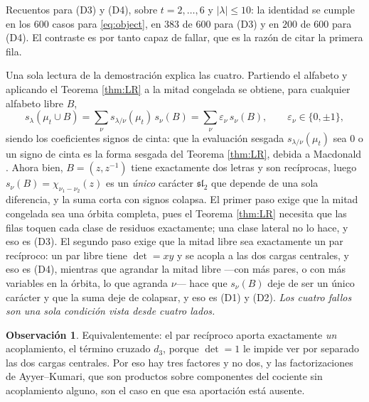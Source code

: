 \documentclass[11pt,reqno]{amsart}
\theoremstyle{plain}
\theoremstyle{definition}
\newtheorem{remark}[theorem]{Observación}
\newcommand{\zt}{\mu_t}
\begin{document}
Recuentos para (D3) y (D4), sobre $t=2,\dots,6$ y $|\lambda|\le10$: la identidad se cumple en los
$600$ casos para \eqref{eq:object}, en $383$ de $600$ para (D3) y en $200$ de $600$ para (D4). El
contraste es por tanto capaz de fallar, que es la razón de citar la primera fila.

Una sola lectura de la demostración explica las cuatro. Partiendo el alfabeto y aplicando el Teorema
\ref{thm:LR} a la mitad congelada se obtiene, para cualquier alfabeto libre $B$,
\begin{equation}\label{eq:threestep}
s_\lambda(\zt\cup B)=\sum_{\nu}s_{\lambda/\nu}(\zt)\,s_\nu(B)=\sum_\nu\varepsilon_\nu\,s_\nu(B),
\qquad \varepsilon_\nu\in\{0,\pm1\},
\end{equation}
siendo los coeficientes signos de cinta: que la evaluación sesgada $s_{\lambda/\nu}(\zt)$ sea $0$ o
un signo de cinta es la forma sesgada del Teorema \ref{thm:LR}, debida a Macdonald
\cite[p.~91]{Mac95}. Ahora bien, $B=(z,z^{-1})$ tiene exactamente dos letras y
son recíprocas, luego $s_\nu(B)=\chi_{\nu_1-\nu_2}(z)$ es un \emph{único} carácter
$\mathfrak{sl}_2$ que depende de una sola diferencia, y la suma corta con signos colapsa. El primer
paso exige que la mitad congelada sea una órbita completa, pues el Teorema \ref{thm:LR} necesita que
las filas toquen cada clase de residuos exactamente; una clase lateral no lo hace, y eso es (D3). El
segundo paso exige que la mitad libre sea exactamente un par recíproco: un par libre tiene
$\det=xy$ y se acopla a las dos cargas centrales, y eso es (D4), mientras que agrandar la mitad libre
---con más pares, o con más variables en la órbita, lo que agranda $\nu$--- hace que $s_\nu(B)$ deje
de ser un único carácter y que la suma deje de colapsar, y eso es (D1) y (D2). \emph{Los cuatro
fallos son una sola condición vista desde cuatro lados.}

\begin{remark}
Equivalentemente: el par recíproco aporta exactamente \emph{un} acoplamiento, el término cruzado
$d_3$, porque $\det=1$ le impide ver por separado las dos cargas centrales. Por eso hay tres factores
y no dos, y las factorizaciones de Ayyer--Kumari, que son productos sobre componentes del cociente
sin acoplamiento alguno, son el caso en que esa aportación está ausente.
\end{remark}
\end{document}
